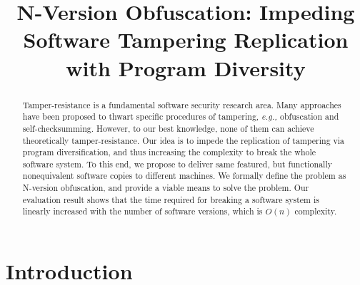 \documentclass[10pt, conference]{IEEEtran}
\begin{document}
\title{N-Version Obfuscation: Impeding Software Tampering Replication with Program Diversity}

\author{
}

\maketitle

\thispagestyle{plain}

\begin{abstract}

Tamper-resistance is a fundamental software security research area.  Many approaches have been proposed to thwart specific procedures of tampering, \textit{e.g.,} obfuscation and self-checksumming.  However, to our best knowledge, none of them can achieve theoretically tamper-resistance.  Our idea is to impede the replication of tampering via program diversification, and thus increasing the complexity to break the whole software system.  To this end, we propose to deliver same featured, but functionally nonequivalent software copies to different machines.  We formally define the problem as N-version obfuscation, and provide a viable means to solve the problem.  Our evaluation result shows that the time required for breaking a software system is linearly increased with the number of software versions, which is $O(n)$ complexity.  

\end{abstract}

\section{Introduction}
\end{document}

